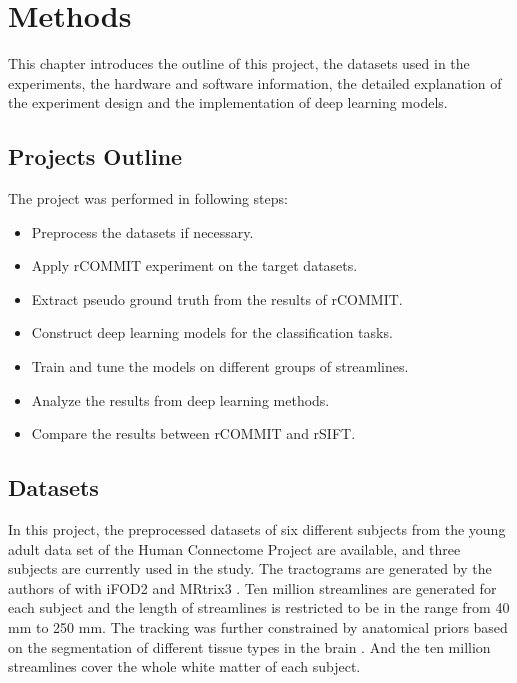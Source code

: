 \chapter{Methods}

This chapter introduces the outline of this project, the datasets used in the experiments, the hardware and software information, the detailed 
explanation of the experiment design and the implementation of deep learning models.

\section{Projects Outline}
The project was performed in following steps:
\begin{itemize}
    \item Preprocess the datasets if necessary.
    \item Apply rCOMMIT experiment on the target datasets.
    \item Extract pseudo ground truth from the results of rCOMMIT.
    \item Construct deep learning models for the classification tasks.
    \item Train and tune the models on different groups of streamlines.
    \item Analyze the results from deep learning methods.
    \item Compare the results between rCOMMIT and rSIFT.
  \end{itemize}

\section{Datasets}
In this project, the preprocessed datasets of six different subjects from the young adult data set of the Human Connectome Project \cite{vanessenWUMinnHumanConnectome2013} are available,
and three subjects are currently used in the study.
The tractograms are generated by the authors of \cite{TractSegFastAccurate} with iFOD2 \cite{tournierImprovedProbabilisticStreamlinesa} and MRtrix3 \cite{tournierMRtrix3FastFlexible2019}. 
Ten million streamlines are generated for each subject and the length of streamlines is restricted to be in the range from 40 mm to 250 mm.
The tracking was further constrained by anatomical priors based on the segmentation of different tissue types in the brain \cite{smithAnatomicallyconstrainedTractographyImproved2012}.
And the ten million streamlines cover the whole white matter of each subject. 

